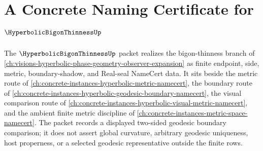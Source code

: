 \chapter{A Concrete Naming Certificate for $\HyperbolicBigonThinnessUp$}
\label{ch:concrete-instances-hyperbolic-bigon-thinness-namecert}

The $\HyperbolicBigonThinnessUp$ packet realizes the bigon-thinness branch of \autoref{ch:visions-hyperbolic-phase-geometry-observer-expansion} as finite endpoint, side, metric, boundary-shadow, and Real-seal NameCert data. It sits beside the metric route of \autoref{ch:concrete-instances-hyperbolic-metric-namecert}, the boundary route of \autoref{ch:concrete-instances-hyperbolic-geodesic-boundary-namecert}, the visual comparison route of \autoref{ch:concrete-instances-hyperbolic-visual-metric-namecert}, and the ambient finite metric discipline of \autoref{ch:concrete-instances-metric-space-namecert}. The packet records a displayed two-sided geodesic boundary comparison; it does not assert global curvature, arbitrary geodesic uniqueness, host properness, or a selected geodesic representative outside the finite rows.

